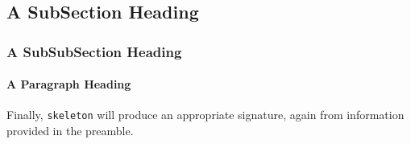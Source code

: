 \documentclass[10pt, oneside]{skeleton}
\begin{document}
	\subsection{A SubSection Heading} %
	\label{sub:a_subsection_heading}
	
	\subsubsection{A SubSubSection Heading} %
	\label{ssub:a_subsubsection_heading}
	
	\paragraph{A Paragraph Heading} %
	\label{par:a_paragraph_heading}
	
	\pa Finally, \texttt{skeleton} will produce an appropriate signature, again from information provided in the preamble. \label{sig}
		
\sign
	
\end{document}
